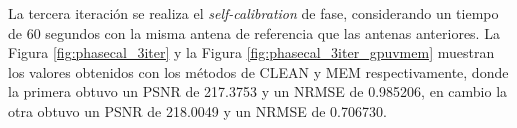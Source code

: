 La tercera iteración se realiza el \textit{self-calibration} de fase, considerando un tiempo de 60 segundos con la misma antena de referencia que las antenas anteriores. La Figura \ref{fig:phasecal_3iter} y la Figura \ref{fig:phasecal_3iter_gpuvmem} muestran los valores obtenidos con los métodos de CLEAN y MEM respectivamente, donde la primera obtuvo un PSNR de 217.3753 y un NRMSE de 0.985206, en cambio la otra obtuvo un PSNR de 218.0049  y un NRMSE de 0.706730.  

\begin{figure}[!ht]
 \centering
    \vspace{0.3cm}
\end{figure}
